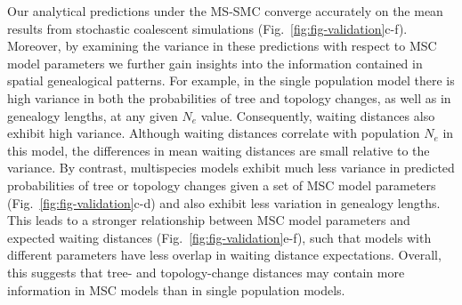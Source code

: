 \documentclass[11pt]{article}
\begin{document}
Our analytical predictions under the MS-SMC converge accurately on 
the mean results from stochastic coalescent simulations 
(Fig.~\ref{fig:fig-validation}c-f). 
Moreover, by examining the variance in these predictions with 
respect to MSC model parameters we further gain insights into 
the information contained in spatial genealogical patterns.
For example, in the single population model there is high variance 
in both the probabilities of tree and topology changes, as well as in genealogy
lengths, at any given $N_e$ value. Consequently, waiting distances also 
exhibit high variance. Although waiting distances correlate with population $N_e$ 
in this model, the differences in mean waiting distances are small relative to the variance. 
By contrast, multispecies models exhibit much less variance in predicted probabilities 
of tree or topology changes given a set of MSC model parameters 
(Fig.~\ref{fig:fig-validation}c-d) and also exhibit less variation in genealogy
lengths. This leads to a stronger relationship between MSC model parameters and 
expected waiting distances (Fig.~\ref{fig:fig-validation}e-f), such that models
with different parameters have less overlap in waiting distance expectations.
Overall, this suggests that tree- and topology-change distances may contain more 
information in MSC models than in single population models.
\end{document}
